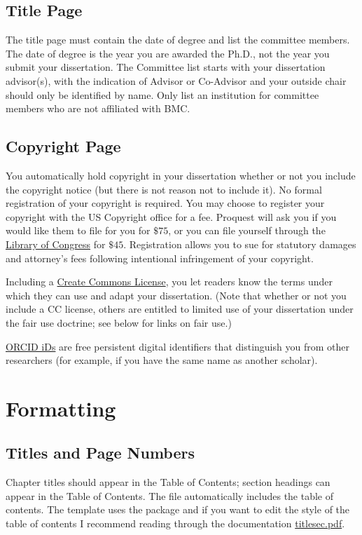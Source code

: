 \documentclass[12pt]{report}
\begin{document}
\section{Title Page}
The title page must contain the date of degree and list the committee members. The date of degree is the year you are awarded the Ph.D., not the year you submit your dissertation. The Committee list starts with your dissertation advisor(s), with the indication of Advisor or Co-Advisor and your outside chair should only be identified by name. Only list an institution for committee members who are not affiliated with BMC.
\section{Copyright Page}
You automatically hold copyright in your dissertation whether or not you include the copyright notice (but there is not reason not to include it). No formal registration of your copyright is required. You may choose to register your copyright with the US Copyright office for a fee. Proquest will ask you if you would like them to file for you for $\$75$, or you can file yourself through the \href{https://www.copyright.gov/registration/}{Library of Congress} for $\$45$. Registration allows you to sue for statutory damages and attorney's fees following intentional infringement of your copyright.

Including a \href{https://creativecommons.org/licenses/}{Create Commons License}, you let readers know the terms under which they can use and adapt your dissertation. (Note that whether or not you include a CC license, others are entitled to limited use of your dissertation under the fair use doctrine; see below for links on fair use.)

\href{https://orcid.org/}{ORCID iDs} are free persistent digital identifiers that distinguish you from other researchers (for example, if you have the same name as another scholar).


\chapter{Formatting}
\section{Titles and Page Numbers}
Chapter titles should appear in the Table of Contents; section headings can appear in the Table of Contents. The  file automatically includes the table of contents. The template uses the  package and if you want to edit the style of the table of contents I recommend reading through the documentation \href{https://github.com/cacsphysics/BMC_Template_Info_Files/blob/main/titlesec.pdf}{titlesec.pdf}. 
\end{document}
